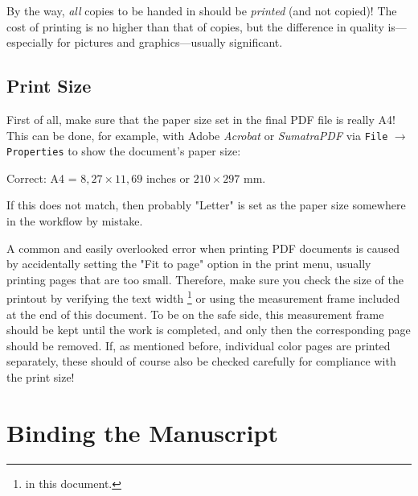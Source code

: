 By the way, \emph{all} copies to be handed in should be \emph{printed} (and not 
copied)! The cost of printing is no higher than that of copies, but the difference
in quality is---especially for pictures and graphics---usually significant.


\subsection{Print Size}

First of all, make sure that the paper size set in the final PDF file is really
\textrm{A4}! This can be done, for example, with Adobe \emph{Acrobat} or 
\emph{SumatraPDF} via \texttt{File} $\rightarrow$ \texttt{Properties} 
to show the document's paper size:
%
\begin{center}
	\textrm{Correct:} A4 = $8{,}27 \times 11{,}69$ inches or $210 \times 297$ mm.
\end{center}
%
If this does not match, then probably "Letter" is set as the paper size somewhere
in the workflow by mistake.

A common and easily overlooked error when printing PDF documents is caused by 
accidentally setting the "Fit to page" option in the print menu, usually printing 
pages that are too small. Therefore, make sure you check the size of the printout 
by verifying the text width%
\footnote{\Convert[unit=mm]{\the\textwidth}	in this document.} %
or using the measurement frame included at the end of this document.
To be on the safe side, this measurement frame should be kept until the work 
is completed, and only then the corresponding page should be removed.
If, as mentioned before, individual color pages are printed separately, these 
should of course also be checked carefully for compliance with the print size!


\section{Binding the Manuscript}

